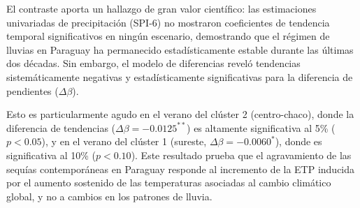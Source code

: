 \documentclass[11pt,a4paper]{article}
\begin{document}
\begin{table}[ht!]
\centering
\caption{Comparación empírica de tendencias anuales netas y significancia del efecto del calentamiento global (SPEI-6 vs. SPI-6) en Paraguay (2000--2023).}
\label{tab:contraste_spei_spi}
\end{table}

El contraste aporta un hallazgo de gran valor científico: las estimaciones univariadas de precipitación (SPI-6) no mostraron coeficientes de tendencia temporal significativos en ningún escenario, demostrando que el régimen de lluvias en Paraguay ha permanecido estadísticamente estable durante las últimas dos décadas. Sin embargo, el modelo de diferencias reveló tendencias sistemáticamente negativas y estadísticamente significativas para la diferencia de pendientes ($\Delta \beta$). 

Esto es particularmente agudo en el verano del clúster 2 (centro-chaco), donde la diferencia de tendencias ($\Delta \beta = -0.0125^{**}$) es altamente significativa al 5\% ($p < 0.05$), y en el verano del clúster 1 (sureste, $\Delta \beta = -0.0060^*$), donde es significativa al 10\% ($p < 0.10$). Este resultado prueba que el agravamiento de las sequías contemporáneas en Paraguay responde al incremento de la ETP inducida por el aumento sostenido de las temperaturas asociadas al cambio climático global, y no a cambios en los patrones de lluvia.
\end{document}
